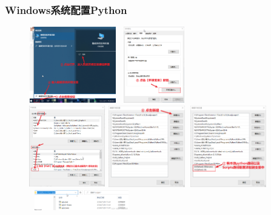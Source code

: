 \begin{frame}
	\frametitle{\textrm{Windows}系统配置\textrm{Python}}
\begin{figure}[h!]
\vspace*{-0.18in}
\centering
\includegraphics[height=1.3in, width=1.5in, viewport=0 0 728 639,clip]{Figures/python_config-windows-1.png}
\includegraphics[height=1.3in, width=1.2in, viewport=0 0 479 598,clip]{Figures/python_config-windows-2.png}\\
\hspace*{-0.11in}
\includegraphics[height=1.4in, width=1.3in, viewport=0 0 618 659,clip]{Figures/python_config-windows-3.png}
\includegraphics[height=1.4in, width=1.35in, viewport=0 0 527 563,clip]{Figures/python_config-windows-4.png}
\includegraphics[height=1.4in, width=1.35in, viewport=0 0 527 563,clip]{Figures/python_config-windows-5.png}\\
\includegraphics[height=0.35in, width=1.8in, viewport=0 0 640 140,clip]{Figures/python_config-windows-pip.png}
\label{Python-config_windows}
\end{figure}
\end{frame}


